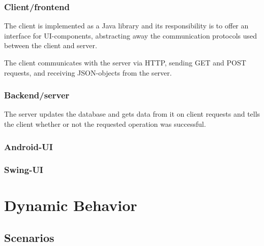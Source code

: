 \documentclass[11pt]{article}
\begin{document}

\subsubsection{Client/frontend}
The client is implemented as a Java library and its responsibility is to offer an interface
for UI-components, abstracting away the communication protocols used between the client and server.

The client communicates with the server via HTTP, sending GET and POST requests, and receiving JSON-objects from the server.


\subsubsection{Backend/server}
The server updates the database and gets data from it on client requests and tells the client whether or not the requested operation was successful.

\subsubsection{Android-UI}
\subsubsection{Swing-UI}
     

\section{Dynamic Behavior}
\subsection{Scenarios}
\end{document}

